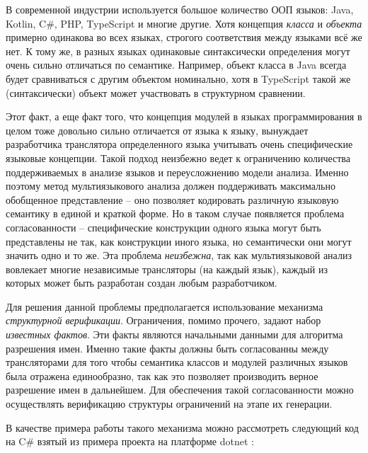 В современной индустрии используется большое количество ООП языков: Java, Kotlin, C\#, PHP, TypeScript и многие другие.
Хотя концепция \textit{класса} и \textit{объекта} примерно одинакова во всех языках, строгого соответствия между
языками всё же нет. К тому же, в разных языках одинаковые синтаксически определения могут очень сильно отличаться по
семантике. Например, объект класса в Java всегда будет сравниваться с другим объектом номинально, хотя
в TypeScript такой же (синтаксически) объект может участвовать в структурном сравнении.

Этот факт, а еще факт того, что концепция модулей в языках программирования в целом тоже довольно сильно
отличается от языка к языку, вынуждает разработчика транслятора определенного языка учитывать очень
специфические языковые концепции. Такой подход неизбежно ведет к ограничению количества поддерживаемых в анализе языков
и переусложнению модели анализа.
Именно поэтому метод мультиязыкового анализа должен поддерживать максимально
обобщенное представление -- оно позволяет кодировать различную языковую семантику в единой и краткой форме. Но в таком случае
появляется проблема согласованности -- специфические конструкции одного языка могут быть представлены не так, как конструкции иного языка, но
семантически они могут значить одно и то же. Эта проблема \textit{неизбежна}, так как мультиязыковой анализ
 вовлекает многие независимые трансляторы (на каждый язык), каждый из которых может быть разработан создан любым разработчиком. 

Для решения данной проблемы предполагается использование механизма \textit{структурной верификации}. Ограничения, помимо прочего,
задают набор \textit{известных фактов}. Эти факты являются начальными данными для алгоритма разрешения имен. Именно
такие факты должны быть согласованны между трансляторами для того чтобы семантика классов и модулей различных языков
была отражена единообразно, так как это позволяет производить верное разрешение имен в дальнейшем. Для обеспечения такой
согласованности можно осуществлять верификацию структуры ограничений на этапе их генерации.

В качестве примера работы такого механизма можно рассмотреть следующий код на C\# взятый из примера проекта на платформе dotnet \cite{eShopOnWeb}:

